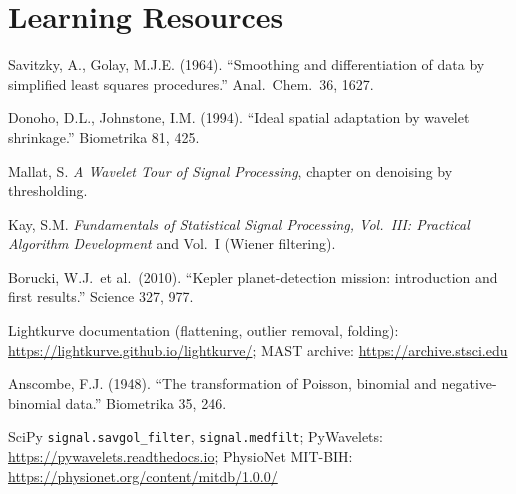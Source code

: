 \documentclass[11pt,a4paper]{article}
\begin{document}
\section*{Learning Resources}
\begin{resources}
  \item Savitzky, A., Golay, M.J.E. (1964). ``Smoothing and differentiation of data by simplified least squares procedures.'' Anal.\ Chem.\ 36, 1627.
  \item Donoho, D.L., Johnstone, I.M. (1994). ``Ideal spatial adaptation by wavelet shrinkage.'' Biometrika 81, 425.
  \item Mallat, S. \emph{A Wavelet Tour of Signal Processing}, chapter on denoising by thresholding.
  \item Kay, S.M. \emph{Fundamentals of Statistical Signal Processing, Vol.~III: Practical Algorithm Development} and Vol.~I (Wiener filtering).
\end{resources}
\begin{resources}
  \item Borucki, W.J.\ et al.\ (2010). ``Kepler planet-detection mission: introduction and first results.'' Science 327, 977.
  \item Lightkurve documentation (flattening, outlier removal, folding): \url{https://lightkurve.github.io/lightkurve/}; MAST archive: \url{https://archive.stsci.edu}
  \item Anscombe, F.J. (1948). ``The transformation of Poisson, binomial and negative-binomial data.'' Biometrika 35, 246.
\end{resources}
\begin{resources}
  \item SciPy \texttt{signal.savgol\_filter}, \texttt{signal.medfilt}; PyWavelets: \url{https://pywavelets.readthedocs.io}; PhysioNet MIT-BIH: \url{https://physionet.org/content/mitdb/1.0.0/}
\end{resources}

\evaluation
\end{document}
